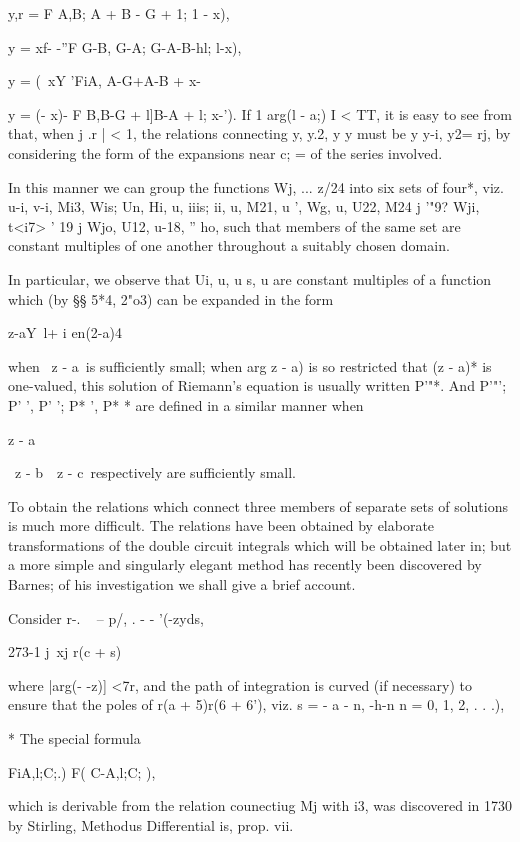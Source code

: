 y,r = F A,B; A + B - G + 1; 1 - x),

y = xf- -''F G-B, G-A; G-A-B-hl; l-x),

y = (\ xY 'FiA, A-G+\;A-B + \; x-%

y = (- x)- F B,B-G + l]B-A + l; x-'). If 1 arg(l - a;) I < TT, it is
easy to see from that, when j .r | < 1, the relations
connecting y, y.2, y y must be y y-i, y2= rj, by considering the
form of the expansions near c; = of the series involved.

In this manner we can group the functions Wj, ... z/24 into six sets
of four*, viz. u-i, v-i, Mi3, Wis; Un, Hi, u, iiis; ii, u, M21, u
', Wg, u, U22, M24 j '"9? Wji, t<i7> ' 19 j Wjo, U12, u-18, '' ho,
such that members of the same set are constant multiples of one
another throughout a suitably chosen domain.

In particular, we observe that Ui, u, u s, u are constant multiples
of a function which (by §§ 5*4, 2"o3) can be expanded in the form

 z-aY\ l+ i en(2-a)4

when \ z - a\ is sufficiently small; when arg z - a) is so restricted
that (z - a)* is one-valued, this solution of Riemann's equation is
usually written P'"*. And P'"'; P' ', P' '; P* ', P* * are defined in
a similar manner when

z - a

\ z - b\, \ z - c\ respectively are sufficiently small.

To obtain the relations which connect three members of separate sets
of solutions is much more difficult. The relations have been obtained
by elaborate transformations of the double circuit integrals which
will be obtained later in; but a more simple and singularly
elegant method has recently been discovered by Barnes; of his
investigation we shall give a brief account.


Consider r-. ~ -- p/, . - - '(-zyds,

273-1 j\ xj r(c + s)

where |arg(- -z)] <7r, and the path of integration is curved (if
necessary) to ensure that the poles of r(a + 5)r(6 + 6'), viz. s = - a
- n, -h-n n = 0, 1, 2, . . .),

* The special formula

FiA,l;C;.) F( C-A,l;C; ),

which is derivable from the relation counectiug Mj with i3, was
discovered in 1730 by Stirling, Methodus Differential is, prop. vii.

